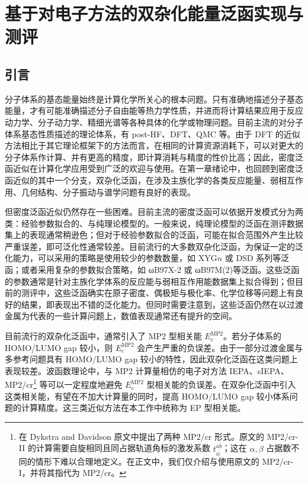 
\chapter{基于对电子方法的双杂化能量泛函实现与测评}

\section{引言}

分子体系的基态能量始终是计算化学所关心的根本问题。只有准确地描述分子基态能量，才有可能准确描述分子自由能等热力学性质，并进而将计算结果应用于反应动力学、分子动力学、精细光谱等各种具体的化学或物理问题。目前主流的对分子体系基态性质描述的理论体系，有 post-HF、DFT、QMC 等。由于 DFT 的近似方法相比于其它理论框架下的方法而言，在相同的计算资源消耗下，可以对更大的分子体系作计算、并有更高的精度，即计算消耗与精度的性价比高；因此，密度泛函近似在计算化学应用受到广泛的欢迎与使用。在第一章绪论中，也回顾到密度泛函近似的其中一个分支，双杂化泛函，在涉及主族化学的各类反应能量、弱相互作用、几何结构、分子振动与谱学问题有良好的表现。

但密度泛函近似仍然存在一些困难。目前主流的密度泛函可以依据开发模式分为两类：经验参数拟合的、与纯理论模型的。一般来说，纯理论模型的泛函在测评数据集上的表现通常稍逊色\cite{Goerigk-Grimme.PCCP.2017}；但对于经验参数拟合的泛函，可能在拟合范围外产生比较严重误差，即可泛化性通常较差\cite{Medvedev-Lyssenko.S.2017}。目前流行的大多数双杂化泛函，为保证一定的泛化能力，可以采用的策略是使用较少的参数数量，如 XYG$n$\cite{Zhang-Xu.JPCL.2021} 或 DSD 系列\cite{Kozuch-Martin.JCC.2013}等泛函；或者采用复杂的参数拟合策略，如 ωB97X-2\cite{Chai-Head-Gordon.JCP.2009} 或 ωB97M(2)\cite{Mardirossian-Head-Gordon.JCP.2018}等泛函。这些泛函的参数通常是针对主族化学体系的反应能与弱相互作用能数据集上拟合得到；但目前的测评中，这些泛函确实在原子密度\cite{Su-Xu.PNAS.2018}、偶极矩与极化率\cite{Hait-Head-Gordon.JCTC.2018, Hait-Head-Gordon.PCCP.2018}、化学位移\cite{Stoychev-Neese.JCTC.2018}等问题上有良好的结果，即表现出不错的泛化能力。但同时需要注意到，这些泛函仍然在以过渡金属为代表的一些计算问题上，数值表现通常还有提升的空间。

目前流行的双杂化泛函中，通常引入了 MP2 型相关能 $E_\mathrm{c}^\mathrm{MP2}$。若分子体系的 HOMO/LUMO gap 较小，则 $E_\mathrm{c}^\mathrm{MP2}$ 会产生严重的负误差。由于一部分过渡金属与多参考问题具有 HOMO/LUMO gap 较小的特性，因此双杂化泛函在这类问题上表现较差。波函数理论中，与 MP2 计算量相仿的电子对方法 IEPA\cite{Sinanoǧlu-Sinanoǧlu.ACP.1964, Nesbet-Nesbet.ACP.1965}、sIEPA\cite{Zhang-Scheffler.PRL.2016}、MP2/cr\cite{Dykstra-Davidson.IJQC.2000}\footnote{在 Dykstra and Davidson 原文\cite{Dykstra-Davidson.IJQC.2000}中提出了两种 MP2/cr 形式。原文的 MP2/cr-II 的计算需要自旋相同且同占据轨道角标的激发系数 $t_{i \bar i}^{a \bar b}$；这在 $\alpha, \beta$ 占据数不同的情形下难以合理地定义。在正文中，我们仅介绍与使用原文的 MP2/cr-I，并将其指代为 MP2/cr。} 等可以一定程度地避免 $E_\mathrm{c}^\mathrm{MP2}$ 型相关能的负误差。在双杂化泛函中引入这类相关能，有望在不加大计算量的同时，提高 HOMO/LUMO gap 较小体系问题的计算精度。这三类近似方法在本工作中统称为 EP 型相关能。

